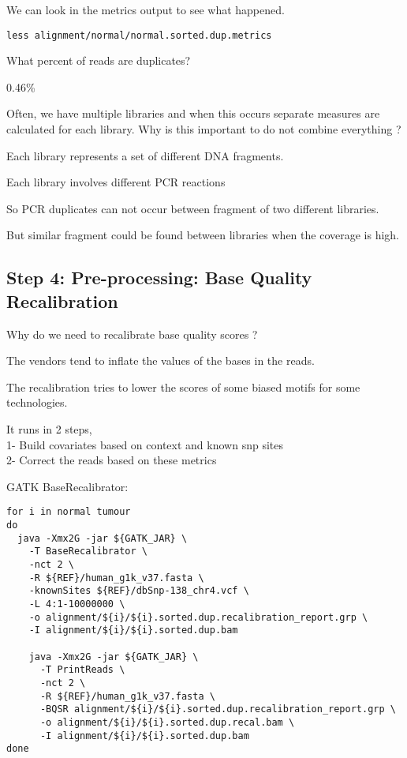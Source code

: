 We can look in the metrics output to see what happened.

\begin{lstlisting}
less alignment/normal/normal.sorted.dup.metrics
\end{lstlisting}

\begin{question} 
What percent of reads are duplicates?
\end{question}
\begin{answer}
0.46\%
\end{answer}

\begin{question} 
Often, we have multiple libraries and when this occurs separate measures are calculated for each library. Why is this important to do not combine everything ?
\end{question}
\begin{answer}
Each library represents a set of different DNA fragments.

Each library involves different PCR reactions

So PCR duplicates can not occur between fragment of two different libraries.

But similar fragment could be found between libraries when the coverage is high.
\end{answer}


\subsection{Step 4: Pre-processing: Base Quality Recalibration}

\begin{question}
Why do we need to recalibrate base quality scores ?
\end{question}
\begin{answer}
The vendors tend to inflate the values of the bases in the reads.
 
The recalibration tries to lower the scores of some biased motifs for some technologies.
\end{answer}

It runs in 2 steps, \\
1- Build covariates based on context and known snp sites \\
2- Correct the reads based on these metrics

GATK BaseRecalibrator:

\begin{lstlisting}
for i in normal tumour
do
  java -Xmx2G -jar ${GATK_JAR} \
    -T BaseRecalibrator \
    -nct 2 \
    -R ${REF}/human_g1k_v37.fasta \
    -knownSites ${REF}/dbSnp-138_chr4.vcf \
    -L 4:1-10000000 \
    -o alignment/${i}/${i}.sorted.dup.recalibration_report.grp \
    -I alignment/${i}/${i}.sorted.dup.bam

    java -Xmx2G -jar ${GATK_JAR} \
      -T PrintReads \
      -nct 2 \
      -R ${REF}/human_g1k_v37.fasta \
      -BQSR alignment/${i}/${i}.sorted.dup.recalibration_report.grp \
      -o alignment/${i}/${i}.sorted.dup.recal.bam \
      -I alignment/${i}/${i}.sorted.dup.bam
done
\end{lstlisting}

